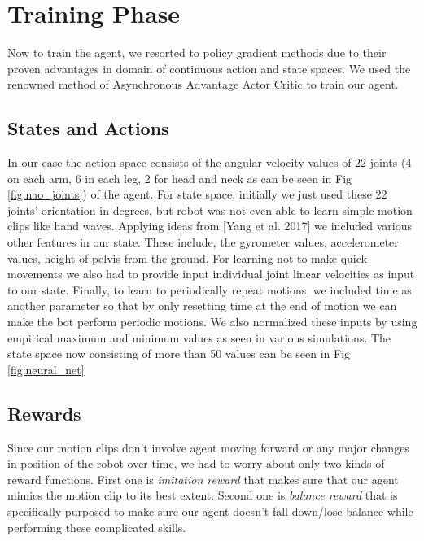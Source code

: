 \newpage

\section{Training Phase} 
Now to train the agent, we resorted to policy gradient methods due to their proven advantages in domain of continuous action and state spaces. We used the renowned method of Asynchronous Advantage Actor Critic \cite{mnih2016asynchronous} to train our agent.

\subsection{States and Actions}
In our case the action space consists of the angular velocity values of 22 joints (4 on each arm, 6 in each leg, 2 for head and neck as can be seen in Fig \ref{fig:nao_joints}) of the agent. For state space, initially we just used these 22 joints' orientation in degrees, but robot was not even able to learn simple motion clips like hand waves. Applying ideas from  [Yang et al. 2017] \cite{yang2017emergence} we included various other features in our state. These include, the gyrometer values, accelerometer values, height of pelvis from the ground. For learning not to make quick movements we also had to provide input individual joint linear velocities as input to our state. Finally, to learn to periodically repeat motions, we included time as another parameter so that by only resetting time at the end of motion we can make the bot perform periodic motions. We also normalized these inputs by using empirical maximum and minimum values as seen in various simulations. The state space now consisting of more than 50 values can be seen in Fig \ref{fig:neural_net}   

\subsection{Rewards}
Since our motion clips don't involve agent moving forward or any major changes in position of the robot over time, we had to worry about only two kinds of reward functions. First one is \textit{imitation reward} that makes sure that our agent mimics the motion clip to its best extent. Second one is \textit{balance reward} that is specifically purposed to make sure our agent doesn't fall down/lose balance while performing these complicated skills.

